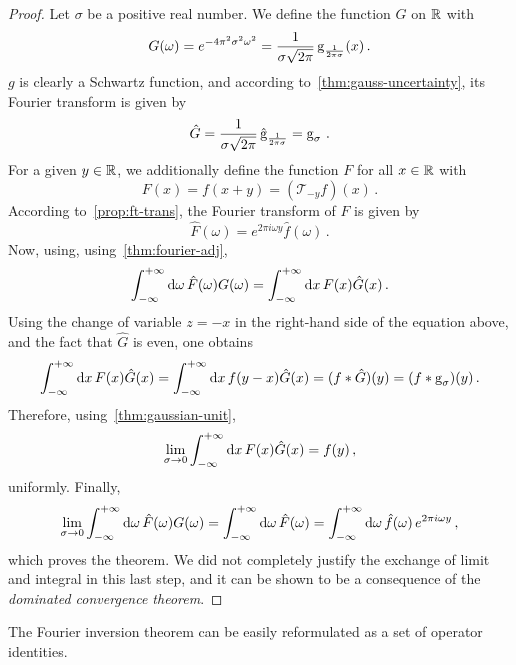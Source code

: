 \begin{proof}
  Let $\sigma$ be a positive real number. We define the function $G$ on $\mathbb{R}$ with
  \begin{equation}
    G(\omega)=e^{-4\pi^2\sigma^2\omega^2}
    =\frac{1}{\sigma\sqrt{2\pi}}\operatorname{g}_{\frac{1}{2\pi\sigma}}(x)\,.
  \end{equation}
  $g$ is clearly a Schwartz function, and according to~\cref{thm:gauss-uncertainty}, its
  Fourier transform is given by
  \begin{equation}
    \hat{G}=\frac{1}{\sigma\sqrt{2\pi}}\,\hat{\operatorname{g}}_{\frac{1}{2\pi\sigma}}
    =\operatorname{g}_{\sigma}\,.
  \end{equation}
  For a given $y\in\mathbb{R}$, we additionally define the function $F$ for all $x\in\mathbb{R}$ with
  \begin{equation}
    F(x)=f(x+y)=(\mathcal{T}_{-y}f)(x)\,.
  \end{equation}
  According to~\cref{prop:ft-trans}, the Fourier transform of $F$ is given by
  \begin{equation}
    \hat{F}(\omega)=e^{2\pi i\omega y}\hat{f}(\omega)\,.
  \end{equation}
  Now, using, using~\cref{thm:fourier-adj},
  \begin{equation}
    \int_{-\infty}^{+\infty}\mathrm{d}{\omega}\,\hat{F}(\omega)G(\omega)=\int_{-\infty}^{+\infty}\mathrm{d}{x}\,F(x)\hat{G}(x)\,.
  \end{equation}
  Using the change of variable $z=-x$ in the right-hand side of the equation above, and
  the fact that $\hat{G}$ is even, one obtains
  \begin{equation}
    \int_{-\infty}^{+\infty}\mathrm{d}{x}\,F(x)\hat{G}(x)=\int_{-\infty}^{+\infty}\mathrm{d}{x}\,f(y-x)\hat{G}(x)=(f\ast\hat{G})(y)
    =(f\ast\operatorname{g}_{\sigma})(y)\,.
  \end{equation}
  Therefore, using~\cref{thm:gaussian-unit},
  \begin{equation}
    \lim_{\sigma\to 0}\int_{-\infty}^{+\infty}\mathrm{d}{x}\,F(x)\hat{G}(x)=f(y)\,,
  \end{equation}
  uniformly. Finally,
  \begin{equation}
    \lim_{\sigma\to 0}\int_{-\infty}^{+\infty}\mathrm{d}{\omega}\,\hat{F}(\omega)G(\omega)=
    \int_{-\infty}^{+\infty}\mathrm{d}{\omega}\,\hat{F}(\omega)=\int_{-\infty}^{+\infty}\mathrm{d}{\omega}\,\hat{f}(\omega)\,e^{2\pi i\omega y}\,,
  \end{equation}
  which proves the theorem. We did not completely justify the exchange of limit and
  integral in this last step, and it can be shown to be a consequence of the
  \emph{dominated convergence theorem}.
\end{proof}
The Fourier inversion theorem can be easily reformulated as a set of operator identities.
